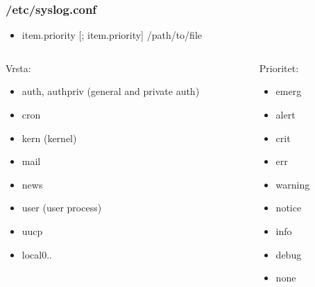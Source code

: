 \documentclass[t,table,usenames,dvipsnames]{beamer}
\begin{document}
\begin{frame}
    \frametitle{/etc/syslog.conf}
    \begin{itemize}
        \item item.priority [; item.priority]   /path/to/file
    \end{itemize}

    \begin{columns}
        \begin{column}{0.5\textwidth}
           Vrsta: \\
            \begin{itemize}
                \item auth, authpriv (general and private auth)
                \item cron
                \item kern (kernel)
                \item mail
                \item news
                \item user (user process)
                \item uucp
                \item local{0..}
            \end{itemize}
        \end{column}
        \begin{column}{0.5\textwidth}  %
            Prioritet: \\
            \begin{itemize}
                \item emerg
                \item alert
                \item crit
                \item err
                \item warning
                \item notice
                \item info
                \item debug
                \item none
            \end{itemize}
        \end{column}
        \end{columns}

\end{frame}
\end{document}
